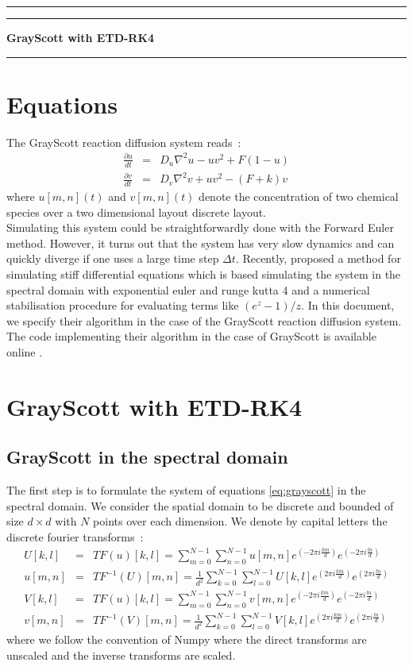 \documentclass[a4paper,12pt]{extarticle}
\begin{document}
\hrule
\hrule
\vspace{3mm}
\centerline{\bf \Large GrayScott with ETD-RK4}
\vspace{3mm}
\hrule

\section{Equations}

The GrayScott reaction diffusion system reads~:
\begin{eqnarray}
\nonumber  \frac{\partial u}{dt} &=& D_u \nabla^2 u - u v^2 + F(1-u)\\
\label{eq:grayscott}  \frac{\partial v}{dt} &=& D_v \nabla^2 v + u v^2 - (F+k)v
\end{eqnarray}
where $u[m,n](t)$ and $v[m,n](t)$ denote the concentration of two chemical species over a two dimensional layout discrete layout.\\

Simulating this system could be straightforwardly done with the Forward Euler method. However, it turns out that the system has very slow dynamics and can quickly diverge if one uses a large time step $\Delta t$. Recently, \cite{Kassam2005,Cox2002} proposed a method for simulating stiff differential equations which is based simulating the system in the spectral domain with exponential euler and runge kutta 4 and a numerical stabilisation procedure for evaluating terms like $(e^z-1)/z$. In this document, we specify their algorithm in the case of the GrayScott reaction diffusion system. The code implementing their algorithm in the case of GrayScott is available online \cite{GithubJFGrayScott}.

\section{GrayScott with ETD-RK4}

\subsection{GrayScott in the spectral domain}
The first step is to formulate the system of equations \eqref{eq:grayscott} in the spectral domain. We consider the spatial domain to be discrete and bounded of size $d \times d$ with $N$ points over each dimension. We denote by capital letters the discrete fourier transforms~:
\begin{eqnarray*}
  U[k, l] &=& TF(u)[k,l] = \sum_{m=0}^{N-1} \sum_{n=0}^{N-1} u[m,n] e^{(-2\pi i \frac{km}{d})}e^{(-2\pi i \frac{ln}{d})}\\
  u[m,n] &=& TF^{-1}(U)[m,n] = \frac{1}{d^2}\sum_{k=0}^{N-1} \sum_{l=0}^{N-1} U[k,l] e^{(2\pi i \frac{km}{d})}e^{(2\pi i \frac{ln}{d})} \\
  V[k, l] &=& TF(u)[k,l] =\sum_{m=0}^{N-1} \sum_{n=0}^{N-1} v[m,n] e^{(-2\pi i \frac{km}{d})}e^{(-2\pi i \frac{ln}{d})}\\
  v[m,n] &=& TF^{-1}(V)[m,n] = \frac{1}{d^2}\sum_{k=0}^{N-1} \sum_{l=0}^{N-1} V[k,l]e^{(2\pi i \frac{km}{d})}e^{(2\pi i \frac{ln}{d})} 
  \end{eqnarray*}
where we follow the convention of Numpy\cite{NumpyFFT} where the direct transforms are unscaled and the inverse transforms are scaled.
\end{document}
